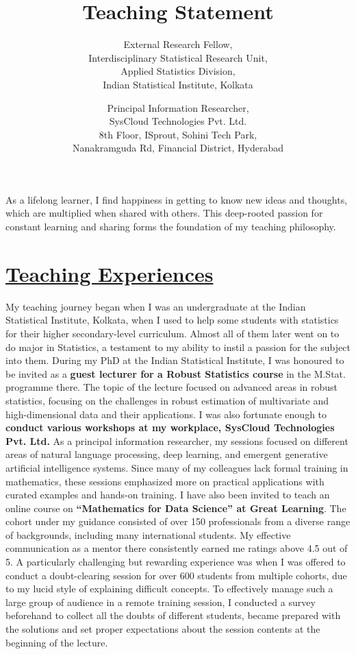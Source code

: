 \documentclass[a4paper,10pt]{article}
\title{Teaching Statement}
\author{External Research Fellow,\\
Interdisciplinary Statistical Research Unit,\\
Applied Statistics Division,\\
Indian Statistical Institute, Kolkata
}
\date{Principal Information Researcher,\\
SysCloud Technologies Pvt. Ltd.\\
8th Floor, ISprout, Sohini Tech Park, \\
Nanakramguda Rd, Financial District, Hyderabad
}
\begin{document}
\maketitle%

As a lifelong learner, I find happiness in getting to know new ideas and thoughts, which are multiplied when shared with others. This deep-rooted passion for constant learning and sharing forms the foundation of my teaching philosophy.

\section*{\underline{Teaching Experiences}}

My teaching journey began when I was an undergraduate at the Indian Statistical Institute, Kolkata, when I used to help some students with statistics for their higher secondary-level curriculum. Almost all of them later went on to do major in Statistics, a testament to my ability to instil a passion for the subject into them. During my PhD at the Indian Statistical Institute, I was honoured to be invited as a \textbf{guest lecturer for a Robust Statistics course} in the M.Stat. programme there. The topic of the lecture focused on advanced areas in robust statistics, focusing on the challenges in robust estimation of multivariate and high-dimensional data and their applications. I was also fortunate enough to \textbf{conduct various workshops at my workplace, SysCloud Technologies Pvt. Ltd.} As a principal information researcher, my sessions focused on different areas of natural language processing, deep learning, and emergent generative artificial intelligence systems. Since many of my colleagues lack formal training in mathematics, these sessions emphasized more on practical applications with curated examples and hands-on training. I have also been invited to teach an online course on \textbf{``Mathematics for Data Science'' at Great Learning}. The cohort under my guidance consisted of over 150 professionals from a diverse range of backgrounds, including many international students. My effective communication as a mentor there consistently earned me ratings above 4.5 out of 5. A particularly challenging but rewarding experience was when I was offered to conduct a doubt-clearing session for over 600 students from multiple cohorts, due to my lucid style of explaining difficult concepts. To effectively manage such a large group of audience in a remote training session, I conducted a survey beforehand to collect all the doubts of different students, became prepared with the solutions and set proper expectations about the session contents at the beginning of the lecture.
\end{document}
